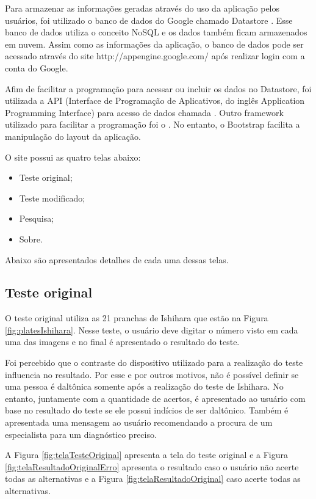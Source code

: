 \documentclass[	12pt, Times, openright, twoside, a4paper, english, brazil]{abntex2}
\begin{document}
Para armazenar as informações geradas através do uso da aplicação pelos usuários, foi utilizado o banco de dados do Google chamado Datastore \cite{googleclouddatastore}. Esse banco de dados utiliza o conceito NoSQL e os dados também ficam armazenados em nuvem. Assim como as informações da aplicação, o banco de dados pode ser acessado através do site http://appengine.google.com/ após realizar login com a conta do Google.

Afim de facilitar a programação para acessar ou incluir os dados no Datastore, foi utilizada a API (Interface de Programação de Aplicativos, do inglês Application Programming Interface) para acesso de dados chamada . Outro framework utilizado para facilitar a programação foi o . No entanto, o Bootstrap facilita a manipulação do layout da aplicação.

O site possui as quatro telas abaixo:

\begin{itemize}
\item Teste original;
\item Teste modificado;
\item Pesquisa;
\item Sobre.
\end{itemize}

Abaixo são apresentados detalhes de cada uma dessas telas.

\subsection{Teste original}
O teste original utiliza as 21 pranchas de Ishihara que estão na Figura \ref{fig:platesIshihara}. Nesse teste, o usuário deve digitar o número visto em cada uma das imagens e no final é apresentado o resultado do teste. 

Foi percebido que o contraste do dispositivo utilizado para a realização do teste influencia no resultado. Por esse e por outros motivos, não é possível definir se uma pessoa é daltônica somente após a realização do teste de Ishihara. No entanto, juntamente com a quantidade de acertos, é apresentado ao usuário com base no resultado do teste se ele possui indícios de ser daltônico. Também é apresentada uma mensagem ao usuário recomendando a procura de um especialista para um diagnóstico preciso.

A Figura \ref{fig:telaTesteOriginal} apresenta a tela do teste original e a Figura \ref{fig:telaResultadoOriginalErro} apresenta o resultado caso o usuário não acerte todas as alternativas e a Figura \ref{fig:telaResultadoOriginal} caso acerte todas as alternativas.
\end{document}
